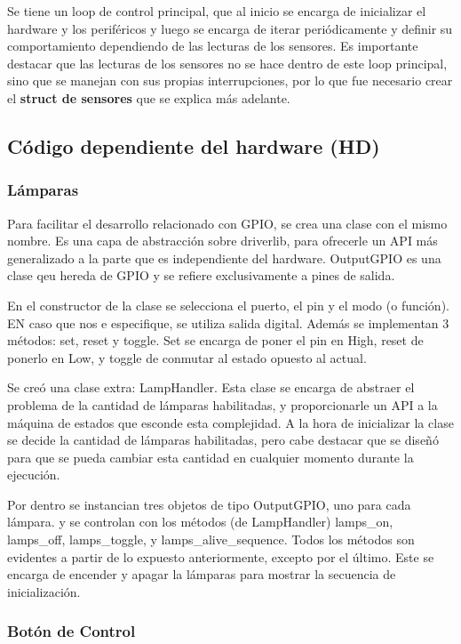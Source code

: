 Se tiene un loop de control principal, que al inicio se encarga de inicializar el hardware y los
periféricos y luego se encarga de iterar periódicamente y definir su comportamiento dependiendo de
las lecturas de los sensores. Es importante destacar que las lecturas de los sensores no se hace
dentro de este loop principal, sino que se manejan con sus propias interrupciones, por lo que fue
necesario crear el \textbf{struct de sensores} que se explica más adelante. 


\subsection{Código dependiente del hardware (HD)}

\subsubsection{Lámparas}
Para facilitar el desarrollo relacionado con GPIO, se crea una clase con el mismo nombre. Es una
capa de abstracción sobre driverlib, para ofrecerle un API más generalizado a la parte que es
independiente del hardware. OutputGPIO es una clase qeu hereda de GPIO y se refiere exclusivamente a
pines de salida.

En el constructor de la clase  se selecciona el puerto, el pin y el modo (o función). EN caso que
nos e especifique, se utiliza salida digital. Además se implementan 3 métodos: set, reset y
toggle. Set se encarga de poner el pin en High, reset de ponerlo en Low, y toggle de conmutar al
estado opuesto al actual.

Se creó una clase extra: LampHandler. Esta clase se encarga de abstraer el problema de la cantidad
de lámparas habilitadas, y proporcionarle un API a la máquina de estados que esconde esta
complejidad. A la hora de inicializar la clase se decide la cantidad de lámparas habilitadas, pero
cabe destacar que se diseñó para que se pueda cambiar esta cantidad en cualquier momento durante la
ejecución.

Por dentro se instancian tres objetos de tipo OutputGPIO, uno para cada lámpara. y se controlan con
los métodos (de LampHandler) lamps\_on, lamps\_off, lamps\_toggle, y lamps\_alive\_sequence. Todos los
métodos son evidentes a partir de lo expuesto anteriormente, excepto por el último. Este se encarga
de encender y apagar la lámparas para mostrar la secuencia de inicialización. 

\subsubsection{Botón de Control}

